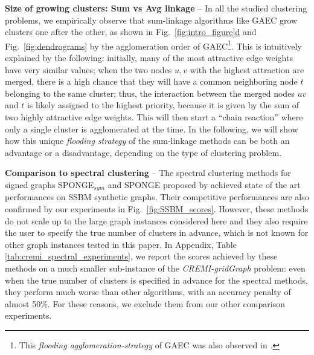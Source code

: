 \textbf{Size of growing clusters: Sum vs Avg linkage} --
In all the studied clustering problems, we empirically observe that sum-linkage algorithms like GAEC grow clusters one after the other, as shown in Fig.~\hyperref[fig:intro_figure]{\ref*{fig:intro_figure}d} and Fig.~\ref{fig:dendrograms} by the agglomeration order of GAEC\footnote{This \emph{flooding agglomeration-strategy} of GAEC was also observed in \cite{kardoostsolving}.}. This is intuitively explained by the  following: initially, many of the most attractive edge weights have very similar values; when the two nodes $u,v$ with the highest attraction are merged, there is a high chance that they will have a common neighboring node $t$ belonging to the same cluster; thus, the interaction between the merged nodes $uv$ and $t$ is likely assigned to the highest priority, because it is given by the sum of two highly attractive edge weights. This will then start a ``chain reaction'' where only a single cluster is agglomerated at the time. 
In the following, we will show how this unique \emph{flooding strategy} of the sum-linkage methods can be both an advantage or a disadvantage, depending on the type of clustering problem. 

\textbf{Comparison to spectral clustering} -- 
The spectral clustering methods for signed graphs SPONGE$_{sym}$ and SPONGE proposed by \cite{Cucuringu2019SPONGEAG} achieved state of the art performances on SSBM synthetic graphs. Their competitive performances are also confirmed by our experiments in Fig.~\ref{fig:SSBM_scores}.
However, these methods do not scale up to the large graph instances considered here and they also require the user to specify the true number of clusters in advance, which is not known for other graph instances tested in this paper. In Appendix, Table \ref{tab:cremi_spectral_experiments}, we report the scores achieved by these methods on a much smaller sub-instance of the \emph{CREMI-gridGraph} problem: even when the true number of clusters is specified in advance for the spectral methods, they perform much worse than other \algname{} algorithms, with an accuracy penalty of almost 50\%. For these reasons, we exclude them from our other comparison experiments.  

